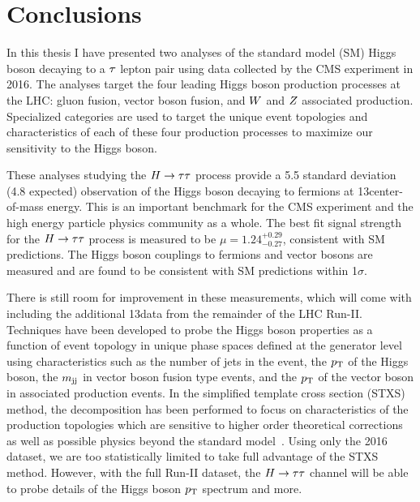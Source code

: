 \chapter{Conclusions}
\label{sec:conclusion}

In this thesis I have presented two analyses of the standard model (SM) Higgs boson decaying 
to a $\tau$ lepton pair using data collected by the CMS experiment in 2016.
The analyses target the four leading Higgs boson production processes at the LHC:
gluon fusion, vector boson fusion, and $W$ and $Z$ associated production.
Specialized categories are used to target the unique event topologies and 
characteristics of each of these four production processes to maximize our
sensitivity to the Higgs boson. 

These analyses studying the $H\to\tau\tau$ process provide a 5.5 standard deviation (4.8 expected)
observation of the Higgs boson decaying to fermions at 13\TeV center-of-mass energy. 
This is an important benchmark for the CMS experiment and the high energy
particle physics community as a whole.
The best fit signal strength for the $H\to\tau\tau$ process is measured to be 
$\mu = 1.24 ^{+0.29} _{-0.27}$, consistent with SM predictions.
The Higgs boson couplings to fermions and vector bosons are measured and are found to be
consistent with SM predictions within 1$\sigma$.

There is still room for improvement in these measurements, which will come with
including the additional 13\TeV data from the remainder of the LHC Run-II. 
Techniques have been developed to probe the Higgs boson properties as a function
of event topology in unique phase spaces defined at the generator 
level using characteristics such as the number of jets
in the event, the $p_\mathrm{T}$ of the Higgs boson, the $m_\mathrm{jj}$ in vector boson
fusion type events, and the $p_\mathrm{T}$ of the
vector boson in associated production events. In the simplified template
cross section (STXS) method, the decomposition has been performed to focus on 
characteristics of the production topologies which are sensitive to higher
order theoretical corrections as well as possible physics beyond the standard
model~\cite{Tackmann:2138079}. Using only the 2016 dataset, we are too
statistically limited to take full advantage of the STXS method. However, with the
full Run-II dataset, the $H\to\tau\tau$ channel will be able to probe details of the
Higgs boson $p_\mathrm{T}$ spectrum and more.

